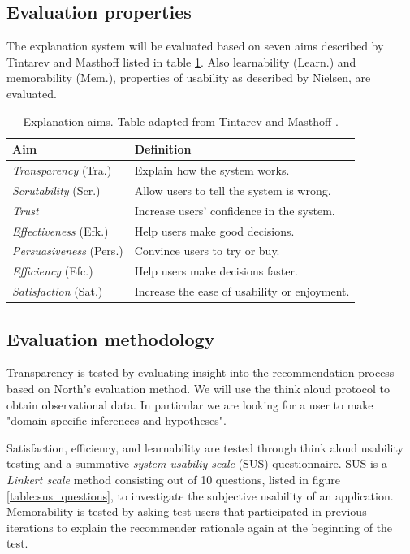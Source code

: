 \subsection{Evaluation properties}\label{introduction:objective:properties}

The explanation system will be evaluated based on seven aims described by Tintarev and Masthoff \cite{tintarev:2007:SER:1547550.1547664} listed in table \ref{table:explanation:aims}. Also learnability (Learn.) and memorability (Mem.), properties of usability as described by Nielsen\cite{nielsen:1993:UE:529793}, are evaluated.

\begin{table}
	\caption{Explanation aims. Table adapted from Tintarev and Masthoff \cite{tintarev:2007:SER:1547550.1547664}.}
	\begin{tabular}{ p{130px} | p{300px} }
		\hline
		\textbf{Aim} 						& \textbf{Definition} \\
		\hline
		\textit{Transparency} (Tra.)		&	Explain how the system works. \\
		\textit{Scrutability}	(Scr.)		&	Allow users to tell the system is wrong. \\
		\textit{Trust}									&	Increase users' confidence in the system. \\
		\textit{Effectiveness} (Efk.)		&	Help users make good decisions. \\
		\textit{Persuasiveness}	(Pers.)	&	Convince users to try or buy. \\
		\textit{Efficiency}	(Efc.)			& Help users make decisions faster. \\
		\textit{Satisfaction} (Sat.)		& Increase the ease of usability or enjoyment. \\
		\hline
	\end{tabular}
	\label{table:explanation:aims}
\end{table}

\subsection{Evaluation methodology}\label{introduction:objective:methodology}

Transparency is tested by evaluating insight into the recommendation process based on North's evaluation method. We will use the think aloud protocol to obtain observational data. In particular we are looking for a user to make "domain specific inferences and hypotheses"\cite{north:2006}.

Satisfaction, efficiency, and learnability are tested through think aloud usability testing and a summative \emph{system usabiliy scale} (SUS) questionnaire. SUS is a \emph{Linkert scale} method consisting out of 10 questions, listed in figure \ref{table:sus_questions}, to investigate the subjective usability of an application\cite{brooke:1996}. Memorability is tested by asking test users that participated in previous iterations to explain the recommender rationale again at the beginning of the test.

